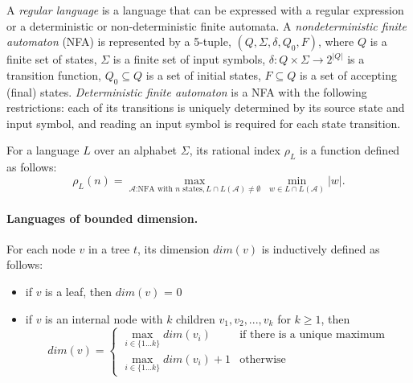 \documentclass[11pt,a4paper]{article} %
\begin{document}
A \textit{regular language} is a language that can be expressed with a regular expression or a deterministic or non-deterministic finite automata.
A \textit{nondeterministic finite automaton} (NFA) is represented by a 5-tuple, $(Q,\Sigma ,\delta ,Q_{0},F)$, where $Q$ is a finite set of states, $\Sigma$ is a finite set of input symbols, $\delta:Q\times \Sigma \rightarrow 2^{|Q|}$ is a transition function, $Q_0 \subseteq Q$ is a set of initial states, $F \subseteq Q$ is a set of accepting (final) states. \textit{Deterministic finite automaton} is a NFA with the following restrictions: each of its transitions is uniquely determined by its source state and input symbol, and reading an input symbol is required for each state transition.


 For a language $L$ over an alphabet $\Sigma$, its rational index $\rho_L$ is a function defined as follows:
$$\rho_L(n) = \max_{\mathcal{A} \text{:NFA with }n\text{ states}, L \cap L(\mathcal{A}) \neq \emptyset}\ \min_{w \in  L \cap L(\mathcal{A})}|w|.$$ 

\paragraph{Languages of bounded dimension.} 
For each node $v$ in a tree $t$, its dimension $dim(v)$ is inductively defined as follows:
\begin{itemize}
\item if $v$ is a leaf, then $dim(v)$ = 0
\item if $v$ is an internal node with $k$ children $v_1, v_2, ..., v_k$ for $k \ge 1$, then 
$$
dim(v) = 
 \begin{cases}
   \max_{i \in \{1...k\}}dim(v_i) &\text{if there is a unique maximum}\\
   \max_{i \in \{1...k\}}dim(v_i)+1 &\text{otherwise}
 \end{cases}
$$
\end{itemize}
\end{document}
